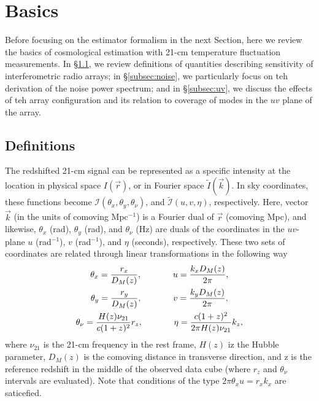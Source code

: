 \section{Basics}
\label{sec:basics}

Before focusing on the estimator formalism in the next Section, here we review the basics of cosmological estimation with 21-cm temperature fluctuation measurements. In \S\ref{subsec:def}, we review definitions of quantities describing sensitivity of interferometric radio arrays; in \S\ref{subsec:noise}, we particularly focus on teh derivation of the noise power spectrum; and in \S\ref{subsec:uv}, we discuss the effects of teh array configuration and its relation to coverage of modes in the $uv$ plane of the array. 

\subsection{Definitions}
\label{subsec:def}

The redshifted 21-cm signal can be represented as a specific intensity at  the location in physical space $I(\vec{r})$, or in Fourier space $\widetilde{I}(\vec{k})$. In sky coordinates, these functions become $\mathcal{I}(\theta_x, \theta_y, \theta_\nu)$, and $\widetilde{\mathcal{I}}(u,v,\eta)$, respectively. Here, vector $\vec{k}$ (in the units of comoving Mpc$^{-1}$) is a Fourier dual of $\vec{r}$ (comoving Mpc), and likewise, $\theta_x$ (rad), $\theta_y$ (rad), and $\theta_\nu$ (Hz) are duals of the coordinates in the $uv$-plane $u$ (rad$^{-1}$), $v$ (rad$^{-1}$), and $\eta$ (seconds), respectively. These two sets of coordinates are related through linear transformations in the following way
\begin{equation}
\begin{gathered}
\theta_x = \frac{r_x}{D_M(z)}, \hspace{0.5in} u = \frac{k_xD_M(z)}{2\pi},\\
\theta_y = \frac{r_y}{D_M(z)}, \hspace{0.5in} v = \frac{k_yD_M(z)}{2\pi},\\
\theta_\nu = \frac{H(z)\nu_{21}}{c(1+z)^2} r_z, \hspace{0.5in} \eta = \frac{c(1+z)^2}{2\pi H(z)\nu_{21}}k_z,
\end{gathered}
\label{eq:fourier_duals}
\end{equation} 
where $\nu_{21}$ is the 21-cm frequency in the rest frame, $H(z)$ iz the Hubble parameter, $D_M(z)$ is the comoving distance in transverse direction, and z is the reference redshift in the middle of the observed data cube (where $r_z$ and $\theta_\nu$ intervals are evaluated). Note that conditions of the type $2\pi\theta_xu = r_xk_x$ are saticefied.

